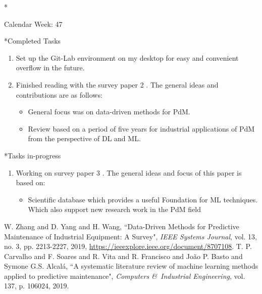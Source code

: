 \documentclass[11pt,a4paper]{article}
\begin{document}
\begin{section}*{Calendar Week: 47 \hfill \date{20 November, 2020}}

\begin{subsection}*{Completed Tasks}
    \begin{enumerate}
        \item
            Set up the Git-Lab environment on my desktop for easy and convenient overflow in the future.
        \item
            Finished reading with the survey paper 2 \cite{survey1}. The general ideas and contributions are as follows:
             \begin{itemize}
             \item General focus was on data-driven methods for PdM.
             \item Review based on a period of five years for industrial applications of PdM from the perspective of DL and ML.
             \end{itemize}
            
    \end{enumerate}
\end{subsection}

\begin{subsection}*{Tasks in-progress}
    \begin{enumerate}
        \item
            Working on survey paper 3 \cite{survey2}. The general ideas and focus of this paper is based on:
            \begin{itemize}
            \item Scientific database which provides a useful Foundation for ML techniques. Which also support new research work in the PdM field 
            \end{itemize}
    \end{enumerate}
\end{subsection}

\begin{thebibliography}{9}
    {W. {Zhang} and D. {Yang} and H. {Wang}},
    “Data-Driven Methods for Predictive Maintenance of Industrial Equipment: A Survey",
    \textit{IEEE Systems Journal},
    vol. 13,
    no. 3,
    pp. 2213-2227,
    2019,
    \href{https://ieeexplore.ieee.org/document/8707108}{https://ieeexplore.ieee.org/document/8707108}.
    {T. P. Carvalho and F. Soares and R. Vita and R. Francisco and Jo{\~a}o P. Basto and Symone G.S. Alcal{\'a}},
    “A systematic literature review of machine learning methods applied to predictive maintenance",
    \textit{Computers \&\ Industrial Engineering},
    vol. 137,
    p. 106024,
    2019.
\end{thebibliography}
\end{section}
\end{document}
